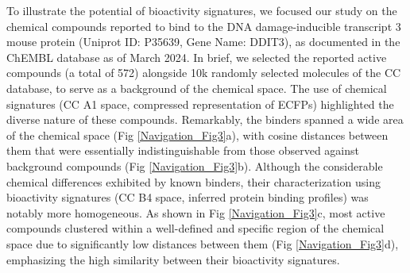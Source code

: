 To illustrate the potential of bioactivity signatures, we focused our study on the chemical compounds reported to bind to the DNA damage-inducible transcript 3 mouse protein (Uniprot ID: P35639, Gene Name: DDIT3), as documented in the ChEMBL\cite{zdrazil_chembl_2024, gaulton_chembl_2017} database as of March 2024. In brief, we selected the reported active compounds (a total of 572) alongside 10k randomly selected molecules of the CC database, to serve as a background of the chemical space. The use of chemical signatures (CC A1 space, compressed representation of ECFPs) highlighted the diverse nature of these compounds. Remarkably, the binders spanned a wide area of the chemical space (Fig \ref{Navigation_Fig3}a), with cosine distances between them that were essentially indistinguishable from those observed against background compounds (Fig \ref{Navigation_Fig3}b). Although the considerable chemical differences exhibited by known binders, their characterization using bioactivity signatures (CC B4 space, inferred protein binding profiles) was notably more homogeneous. As shown in Fig \ref{Navigation_Fig3}c, most active compounds clustered within a well-defined and specific region of the chemical space due to significantly low distances between them (Fig \ref{Navigation_Fig3}d), emphasizing the high similarity between their bioactivity signatures. 



